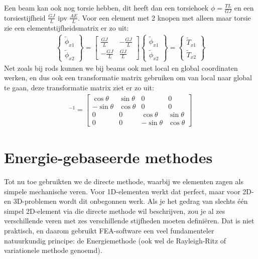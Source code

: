 \documentclass[a4paper,11pt,twoside]{report}
\begin{document}
Een beam kan ook nog torsie hebben, dit heeft dan een torsiehoek $\phi = \frac{TL}{GJ}$ en een
torsiestijfheid $\frac{GJ}{L}$ ipv $\frac{AE}{L}$. Voor een element met 2 knopen met alleen maar
torsie zie een elementstijfheidsmatrix er zo uit:
\begin{align*}
    [k_e]
    \begin{Bmatrix}
        \tilde{\phi}_{x1} \\
        \tilde{\phi}_{x2}
    \end{Bmatrix}
    =
    \begin{bmatrix}
        \frac{GJ}{L}  & -\frac{GJ}{L} \\
        -\frac{GJ}{L} & \frac{GJ}{L}
    \end{bmatrix}
    \begin{Bmatrix}
        \tilde{\phi}_{x1} \\
        \tilde{\phi}_{x2}
    \end{Bmatrix}
    =
    \begin{Bmatrix}
        \tilde{T}_{x1} \\
        \tilde{T}_{x2}
    \end{Bmatrix}
\end{align*}
Net zoals bij rods kunnen we bij beams ook met local en global coordinaten werken, en dus ook een
transformatie matrix gebruiken om van local naar global te gaan, deze transformatie matrix ziet er
zo uit:
\begin{align*}
    [T]^{-1} =
    \begin{bmatrix}
        \cos \theta  & \sin \theta & 0            & 0           \\
        -\sin \theta & \cos \theta & 0            & 0           \\
        0            & 0           & \cos \theta  & \sin \theta \\
        0            & 0           & -\sin \theta & \cos \theta
    \end{bmatrix}
\end{align*}
\newpage
\chapter{Energie-gebaseerde methodes}
Tot nu toe gebruikten we de directe methode, waarbij we elementen zagen als simpele mechanische
veren. Voor 1D-elementen werkt dat perfect, maar voor 2D- en 3D-problemen wordt dit onbegonnen werk.
Als je het gedrag van slechts één simpel 2D-element via die directe methode wil beschrijven, zou je
al zes verschillende veren met zes verschillende stijfheden moeten definiëren. Dat is niet
praktisch, en daarom gebruikt FEA-software een veel fundamenteler natuurkundig principe: de
Energiemethode (ook wel de Rayleigh-Ritz of variationele methode genoemd).
\end{document}
